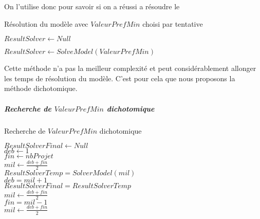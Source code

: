\documentclass{polytech/polytech}
\begin{document}
On l'utilise donc pour savoir si on a réussi a résoudre le 
\begin{algorithm}
\caption{Résolution du modèle avec $ValeurPrefMin$ choisi par tentative} 
\label{chap:problem_affectation:algo:recherche_tatonnement}
$ResultSolver \gets Null$ \\

{

	$ResultSolver \gets SolveModel(ValeurPrefMin)$ \\
	
	
	
	{
		\Break
		
	}
}
\end{algorithm}

Cette méthode n'a pas la meilleur complexité et peut considérablement allonger les temps de résolution du modèle. C'est pour cela que nous proposons la méthode dichotomique.

\subparagraph{Recherche de $ValeurPrefMin$ dichotomique}
\begin{algorithm}
\caption{Recherche de $ValeurPrefMin$ dichotomique} 
\label{chap:problem_affectation:algo:recherche_dichotomique}

$ResultSolverFinal \gets Null$ \\
$deb \gets 1$ \\
$fin \gets nbProjet$ \\
$mil \gets \frac{deb+fin}{2}$ \\
{
	$ResultSolverTemp=SolverModel(mil)$\\
{
$deb=mil+1$\\
$ResultSolverFinal=ResultSolverTemp$\\
$mil \gets \frac{deb+fin}{2}$ \\
}
\Else
{
	$fin=mil-1$\\
	$mil \gets \frac{deb+fin}{2}$ \\
}
}

\end{algorithm}
\end{document}
